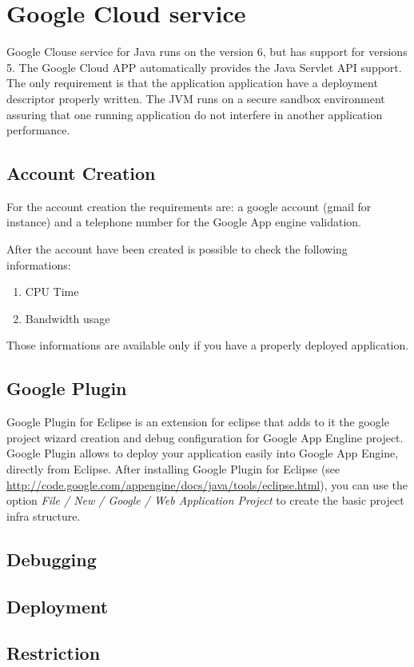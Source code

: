 \documentclass{article}
\begin{document}
\section{Google Cloud service}

Google Clouse service for Java runs on the version 6, but has support for versions 5. 
The Google Cloud APP automatically provides the Java Servlet API support. The only requirement is that the application application have a deployment descriptor properly written. 
The JVM runs on a secure sandbox environment assuring that one running application do not interfere in another application performance.

\subsection{Account Creation}

For the account creation the requirements are: a google account (gmail for instance) and a telephone number for the Google App engine validation.

After the account have been created is possible to check the following informations:
\begin{enumerate}
\item CPU Time
\item Bandwidth usage
\end{enumerate}

Those informations are available only if you have a properly deployed application.

\subsection{Google Plugin}

Google Plugin for Eclipse is an extension for eclipse that adds to it the google project wizard creation and debug configuration for Google App Engline project.
Google Plugin allows to deploy your application easily into Google App Engine, directly from Eclipse.
After installing Google Plugin for Eclipse (see \url{http://code.google.com/appengine/docs/java/tools/eclipse.html}), you can use the option \emph{File / New / Google / Web Application Project} to create the basic project infra structure.

\subsection{Debugging}
\subsection{Deployment}
\subsection{Restriction}
\end{document}
